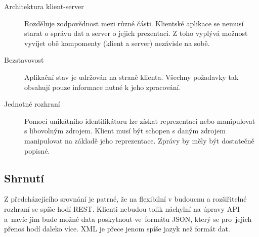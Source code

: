 \begin{description}
    \item[Architektura klient-server]
    Rozděluje zodpovědnost mezi různé části. Klientské aplikace se nemusí starat o správu dat a server o jejich prezentaci.
    Z toho vyplývá možnost vyvíjet obě kompomenty (klient a server) nezávisle na sobě.
    \item[Bezstavovost]
    Aplikační stav je udržován na straně klienta. Všechny požadavky tak obsahují pouze informace nutné k jeho zpracování.  
    \item[Jednotné rozhraní]
    Pomocí unikátního identifikátoru lze získat reprezentaci nebo manipulovat s libovolným zdrojem.
    Klient musí být schopen s daným zdrojem manipulovat na základě jeho reprezentace. Zprávy by měly být dostatečně popisné.
\end{description}

\subsection{Shrnutí}

Z předcházejícího srovnání je patrné, že na flexibilní v budoucnu a rozšiřitelné rozhraní se spíše hodí REST.
Klienti nebudou tolik náchylní na úpravy API a~navíc jim bude možné data poskytnout ve~formátu JSON,
který se pro~jejich přenos hodí daleko více. XML je přece jenom spíše jazyk než formát dat.